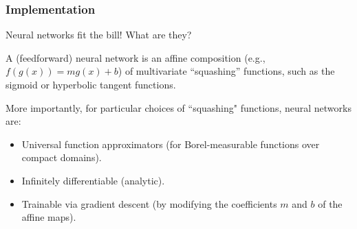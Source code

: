 \begin{frame}
    \frametitle{Implementation}

    Neural networks fit the bill! What are they?

    \medskip
    \pause

    A (feedforward) neural network is an affine composition (e.g., $f(g(x)) = m g(x) + b$) of multivariate ``squashing''
    functions, such as the sigmoid or hyperbolic tangent functions. 
   
    \bigskip
    \pause More importantly, for particular choices of ``squashing" functions, neural networks are:
    \bigskip

    \begin{itemize}
        \setlength\itemsep{1.5em}
        \item Universal function approximators (for Borel-measurable functions over compact domains).
        \item Infinitely differentiable (analytic).
        \item Trainable via gradient descent (by modifying the coefficients $m$ and $b$ of the affine maps).
    \end{itemize}
\end{frame}